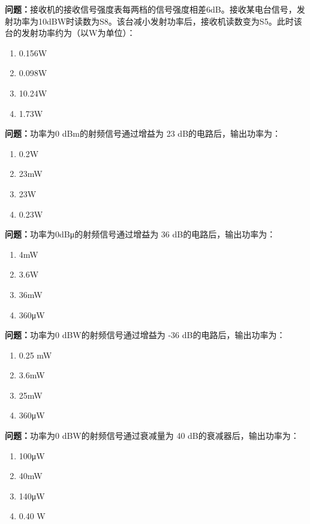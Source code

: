 \bigskip


\noindent\textbf{问题：}接收机的接收信号强度表每两档的信号强度相差6dB。接收某电台信号，发射功率为10dBW时读数为S8。该台减小发射功率后，接收机读数变为S5。此时该台的发射功率约为（以W为单位）：
\begin{enumerate}[label=\Alph*), leftmargin=3em]
\item 0.156W
\item 0.098W
\item 10.24W
\item 1.73W
\end{enumerate}

\bigskip


\noindent\textbf{问题：}功率为0 dBm的射频信号通过增益为 23 dB的电路后，输出功率为：
\begin{enumerate}[label=\Alph*), leftmargin=3em]
\item 0.2W
\item 23mW
\item 23W
\item 0.23W
\end{enumerate}

\bigskip


\noindent\textbf{问题：}功率为0dBμ的射频信号通过增益为 36 dB的电路后，输出功率为：
\begin{enumerate}[label=\Alph*), leftmargin=3em]
\item 4mW
\item 3.6W
\item 36mW
\item 360μW
\end{enumerate}

\bigskip


\noindent\textbf{问题：}功率为0 dBW的射频信号通过增益为 -36 dB的电路后，输出功率为：
\begin{enumerate}[label=\Alph*), leftmargin=3em]
\item 0.25 mW
\item 3.6mW
\item 25mW
\item 360μW
\end{enumerate}

\bigskip


\noindent\textbf{问题：}功率为0 dBW的射频信号通过衰减量为 40 dB的衰减器后，输出功率为：
\begin{enumerate}[label=\Alph*), leftmargin=3em]
\item 100μW
\item 40mW
\item 140μW
\item 0.40 W
\end{enumerate}

